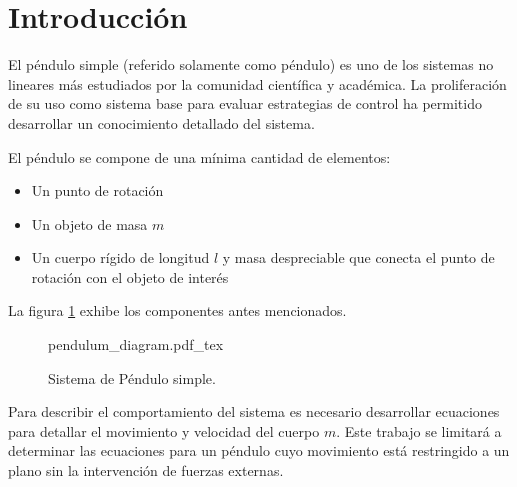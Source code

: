 \section{Introducción}

El péndulo simple (referido solamente como péndulo) es uno 
de los sistemas no lineares más estudiados por la 
comunidad científica y académica. La proliferación de su
uso como sistema base para evaluar estrategias de control ha
permitido desarrollar un conocimiento detallado del sistema.


El péndulo se compone de una mínima cantidad de elementos:
\begin{itemize}
 \item Un punto de rotación 
 \item Un objeto de masa $m$
 \item Un cuerpo rígido de longitud $l$ y masa despreciable que conecta el
 punto de rotación con el objeto de interés
\end{itemize}

La figura \ref{fig: simple pendulum} exhibe los componentes antes 
mencionados.


 \begin{figure}[ht]
    \centering
    {pendulum_diagram.pdf_tex}
    \caption{Sistema de Péndulo simple.}
    \label{fig: simple pendulum}
\end{figure}

Para describir el comportamiento del sistema es necesario desarrollar
ecuaciones para detallar el movimiento y velocidad del cuerpo $m$.
Este trabajo se limitará a determinar las ecuaciones para un péndulo
cuyo movimiento está restringido a un plano sin la intervención de fuerzas
externas.

